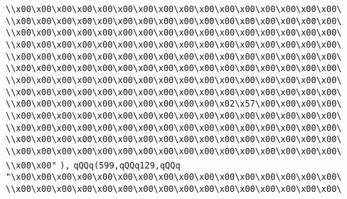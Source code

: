 \verb|\\x00\x00\x00\x00\x00\x00\x00\x00\x00\x00\x00\x00\x00\x00\x00\x00\|\newline
\verb|\\x00\x00\x00\x00\x00\x00\x00\x00\x00\x00\x00\x00\x00\x00\x00\x00\|\newline
\verb|\\x00\x00\x00\x00\x00\x00\x00\x00\x00\x00\x00\x00\x00\x00\x00\x00\|\newline
\verb|\\x00\x00\x00\x00\x00\x00\x00\x00\x00\x00\x00\x00\x00\x00\x00\x00\|\newline
\verb|\\x00\x00\x00\x00\x00\x00\x00\x00\x00\x00\x00\x00\x00\x00\x00\x00\|\newline
\verb|\\x00\x00\x00\x00\x00\x00\x00\x00\x00\x00\x00\x00\x00\x00\x00\x00\|\newline
\verb|\\x00\x00\x00\x00\x00\x00\x00\x00\x00\x00\x00\x00\x00\x00\x00\x00\|\newline
\verb|\\x00\x00\x00\x00\x00\x00\x00\x00\x00\x00\x00\x00\x00\x00\x00\x00\|\newline
\verb|\\x00\x00\x00\x00\x00\x00\x00\x00\x00\x00\x02\x57\x00\x00\x00\x00\|\newline
\verb|\\x00\x00\x00\x00\x00\x00\x00\x00\x00\x00\x00\x00\x00\x00\x00\x00\|\newline
\verb|\\x00\x00\x00\x00\x00\x00\x00\x00\x00\x00\x00\x00\x00\x00\x00\x00\|\newline
\verb|\\x00\x00\x00\x00\x00\x00\x00\x00\x00\x00\x00\x00\x00\x00\x00\x00\|\newline
\verb|\\x00\x00\x00\x00\x00\x00\x00\x00\x00\x00\x00\x00\x00\x00\x00\x00\|\newline
\verb|\\x00\x00"|\newline
\verb|),|\newline
\verb|qQQq(599,qQQq129,qQQq|\newline
\verb|"\x00\x00\x00\x00\x00\x00\x00\x00\x00\x00\x00\x00\x00\x00\x00\x00\|\newline
\verb|\\x00\x00\x00\x00\x00\x00\x00\x00\x00\x00\x00\x00\x00\x00\x00\x00\|\newline
